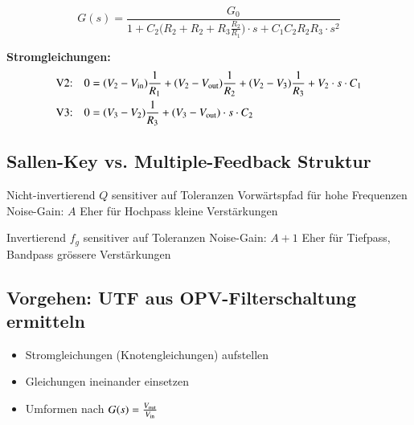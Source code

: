 $$ \boxed{ G(s) = \frac{G_0}{1 + C_2 \Big( R_2 + R_2 + R_3 \frac{R_2}{R_1} \Big) \cdot s + C_1 C_2 R_2 R_3 \cdot s^2 }}$$

\textbf{Stromgleichungen:}
\begin{align*}
    \text{V2:} \quad 0 &= (V_2 - V_{\rm in}) \frac{1}{R_1} + (V_2 - V_{\rm out}) \frac{1}{R_2} + (V_2 - V_3) \frac{1}{R_3} + V_2 \cdot s \cdot C_1  \\
    \text{V3:} \quad 0 &= (V_3 - V_2) \frac{1}{R_3} + (V_3 - V_{\rm out})  \cdot s \cdot C_2 
\end{align*}


\subsection{Sallen-Key vs. Multiple-Feedback Struktur}

\begin{minipage}[t]{0.48\columnwidth}
    \begin{center}
    \end{center}
    \begin{outline}
        \1 Nicht-invertierend
        \1 $Q$ sensitiver auf Toleranzen
        \1 Vorwärtspfad für hohe Frequenzen
        \1 Noise-Gain: $A$
        \1 Eher für 
            \2 Hochpass
            \2 kleine Verstärkungen
    \end{outline}
\end{minipage}
\hfill
\begin{minipage}[t]{0.48\columnwidth}
    \begin{center}
    \end{center}
    \begin{outline}
        \1 Invertierend
        \1 $f_g$ sensitiver auf Toleranzen 
        \1[] 
        \1 Noise-Gain: $A+1$
        \1 Eher für 
            \2 Tiefpass, Bandpass
            \2 grössere Verstärkungen
    \end{outline}
\end{minipage}


\subsection{Vorgehen: UTF aus OPV-Filterschaltung ermitteln}
\begin{itemize}
    \item Stromgleichungen (Knotengleichungen) aufstellen
    \item Gleichungen ineinander einsetzen
    \item Umformen nach $G(s) = \frac{V_{\rm out}}{V_{\rm in}}$
\end{itemize}


